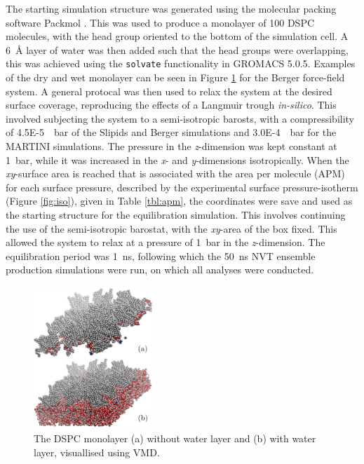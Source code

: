 \documentclass[amsmath,amssymb,twocolumn,superscriptaddress,aps,prl]{revtex4-1}
\begin{document}
The starting simulation structure was generated using the molecular packing software Packmol \cite{Martinez2009}.
This was used to produce a monolayer of 100 DSPC molecules, with the head group oriented to the bottom of the simulation cell.
A \SI{6}{\angstrom} layer of water was then added such that the head groups were overlapping, this was achieved using the \texttt{solvate} functionality in GROMACS 5.0.5.
Examples of the dry and wet monolayer can be seen in Figure \ref{fig:drywet} for the Berger force-field system.
A general protocal was then used to relax the system at the desired surface coverage, reproducing the effects of a Langmuir trough \emph{in-silico}.
This involved subjecting the system to a semi-isotropic barosts, with a compressibility of \SI{4.5E-5}{\per\bar} of the Slipids and Berger simulations and \SI{3.0E-4}{\per\bar} for the MARTINI simulations.
The pressure in the \emph{z}-dimension was kept constant at \SI{1}{\bar}, while it was increased in the \emph{x}- and \emph{y}-dimensions isotropically.
When the \emph{xy}-surface area is reached that is associated with the area per molecule (APM) for each surface pressure, described by the experimental surface pressure-isotherm (Figure \ref{fig:iso}), given in Table \ref{tbl:apm}, the coordinates were save and used as the starting structure for the equilibration simulation.
This involves continuing the use of the semi-isotropic barostat, with the \emph{xy}-area of the box fixed.
This allowed the system to relax at a pressure of \SI{1}{\bar} in the \emph{z}-dimension.
The equilibration period was \SI{1}{\nano\second}, following which the \SI{50}{\nano\second} NVT ensemble production simulations were run, on which all analyses were conducted.
%
\begin{figure}[h]
\centering
  \includegraphics[width=0.4\textwidth]{figures/dspcdrywet}
  \caption{The DSPC monolayer (a) without water layer and (b) with water layer, visuallised using VMD\cite{Humphrey1996}.}
  \label{fig:drywet}
\end{figure}
\end{document}

